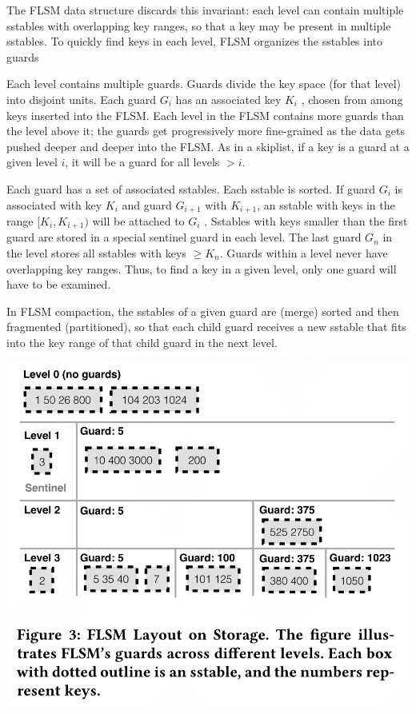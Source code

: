 \documentclass[11pt]{article}
\begin{document}
The FLSM data structure discards this invariant: each level can contain multiple sstables with
overlapping key ranges, so that a key may be present in multiple sstables. To quickly find keys in
each level, FLSM organizes the sstables into guards

Each level contains multiple guards. Guards divide the key space (for that level) into disjoint units.
Each guard \(G_i\) has an associated key \(K_i\) , chosen from among keys inserted into the FLSM. Each
level in the FLSM contains more guards than the level above it; the guards get progressively more
fine-grained as the data gets pushed deeper and deeper into the FLSM. As in a skiplist, if a key is a
guard at a given level \(i\), it will be a guard for all levels \(>i\).

Each guard has a set of associated sstables. Each sstable is sorted. If guard \(G_i\) is associated
with key \(K_i\) and guard \(G_{i+1}\) with \(K_{i+1}\), an sstable with keys in the range
\([K_i,K_{i+1})\) will be attached to \(G_i\) . Sstables with keys smaller than the first guard are
stored in a special sentinel guard in each level. The last guard \(G_n\) in the level stores all
sstables with keys \(\ge K_n\). Guards within a level never have overlapping key ranges. Thus, to find
a key in a given level, only one guard will have to be examined.

In FLSM compaction, the sstables of a given guard are (merge) sorted and then fragmented
(partitioned), so that each child guard receives a new sstable that fits into the key range of that
child guard in the next level.

\begin{center}
\includegraphics[width=.8\textwidth]{../../images/papers/1212.png}
\label{f3}
\end{center}
\end{document}
